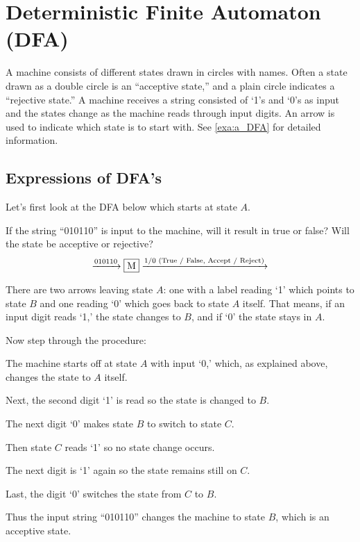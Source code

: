 
\section{Deterministic Finite Automaton (DFA)}

A machine consists of different states drawn in circles with names. Often a state drawn as
a double circle is an ``acceptive state,'' and a plain circle indicates a ``rejective
state.'' A machine receives a string consisted of `1's and `0's as input and the states
change as the machine reads through input digits. An arrow is used to indicate which state
is to start with. See \autoref{exa:a_DFA} for detailed information.

\subsection{Expressions of DFA's}

\begin{example}[A DFA]
    \label{exa:a_DFA}

    Let's first look at the DFA below which starts at state $A$.

    If the string ``010110'' is input to the machine, will it result in true or false?
    Will the state be acceptive or rejective?
    \[
        \xrightarrow{010110}
        \fbox{M}
        \xrightarrow{1/0 \text{ (True / False, Accept / Reject)}}
    \]

    There are two arrows leaving state $A$: one with a label reading `1' which points to
    state $B$ and one reading `0' which goes back to state $A$ itself. That means, if an
    input digit reads `1,' the state changes to $B$, and if `0' the state stays in $A$.

    Now step through the procedure:
    \begin{compactenum}
    \item
        The machine starts off at state $A$ with input `0,' which, as explained above,
        changes the state to $A$ itself.
    \item
        Next, the second digit `1' is read so the state is changed to $B$.
    \item
        The next digit `0' makes state $B$ to switch to state $C$.
    \item
        Then state $C$ reads `1' so no state change occurs.
    \item
        The next digit is `1' again so the state remains still on $C$.
    \item
        Last, the digit `0' switches the state from $C$ to $B$.
    \end{compactenum}
    Thus the input string ``010110'' changes the machine to state $B$, which is an
    acceptive state.

\end{example}

